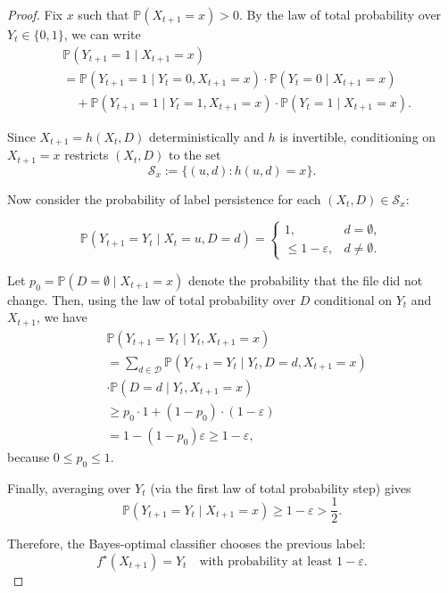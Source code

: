 \documentclass[authoryear,final,5p,times,twocolumn]{elsarticle}
\theoremstyle{plain}
\begin{document}
\begin{proof}
Fix $x$ such that $\mathbb P(X_{t+1}=x) > 0$.  
By the law of total probability over $Y_t \in \{0,1\}$, we can write
\begin{align*}
&\mathbb P(Y_{t+1}=1 \mid X_{t+1}=x) \\
&= \mathbb P(Y_{t+1}=1 \mid Y_t=0, X_{t+1}=x) \cdot \mathbb P(Y_t=0 \mid X_{t+1}=x) \\
&\quad + \mathbb P(Y_{t+1}=1 \mid Y_t=1, X_{t+1}=x) \cdot \mathbb P(Y_t=1 \mid X_{t+1}=x).
\end{align*}

Since $X_{t+1} = h(X_t,D)$ deterministically and $h$ is invertible, conditioning on $X_{t+1}=x$ restricts $(X_t,D)$ to the set
\[
\mathcal S_x := \{(u,d) : h(u,d) = x\}.
\]

Now consider the probability of label persistence for each $(X_t,D) \in \mathcal S_x$:

\[
\mathbb P(Y_{t+1}=Y_t \mid X_t=u, D=d)=
\begin{cases}
1, & d=\emptyset,\\
\le 1-\varepsilon, & d\neq\emptyset.
\end{cases}
\]


Let $p_0 = \mathbb P(D = \emptyset \mid X_{t+1}=x)$ denote the probability that the file did not change. Then, using the law of total probability over $D$ conditional on $Y_t$ and $X_{t+1}$, we have
\begin{align*}
&\mathbb P(Y_{t+1} = Y_t \mid Y_t, X_{t+1}=x) \\
&= \sum_{d \in \mathcal D} \mathbb P(Y_{t+1} = Y_t \mid Y_t, D=d, X_{t+1}=x) \\ &\cdot\mathbb P(D=d \mid Y_t, X_{t+1}=x) \\
&\ge p_0 \cdot 1 + (1-p_0) \cdot (1-\varepsilon) \\
&= 1 - (1-p_0)\varepsilon \ge 1-\varepsilon,
\end{align*}
because $0 \le p_0 \le 1$.

Finally, averaging over $Y_t$ (via the first law of total probability step) gives
\[
\mathbb P(Y_{t+1} = Y_t \mid X_{t+1}=x) \ge 1-\varepsilon > \frac12.
\]

Therefore, the Bayes-optimal classifier chooses the previous label:
\[
f^\star(X_{t+1}) = Y_t \quad \text{with probability at least } 1-\varepsilon.
\]
\end{proof}
\end{document}
